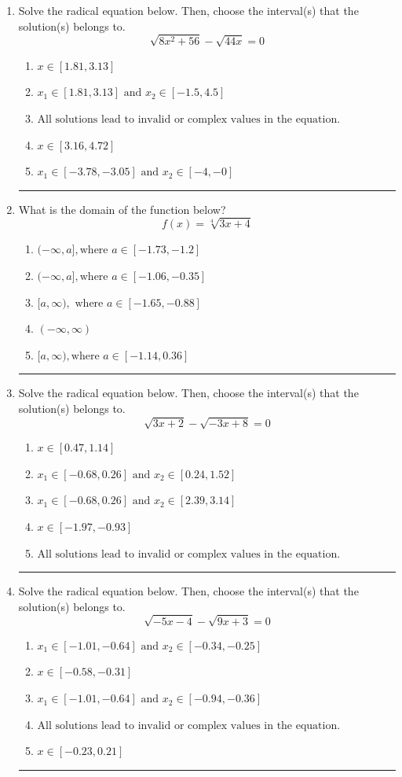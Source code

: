 \documentclass[14pt]{extbook}
\newcommand{\litem}[1]{\item#1\hspace*{-1cm}\rule{\textwidth}{0.4pt}}
\begin{document}
\begin{enumerate}
\litem{
Solve the radical equation below. Then, choose the interval(s) that the solution(s) belongs to.\[ \sqrt{8 x^2 + 56} - \sqrt{44 x} = 0 \]\begin{enumerate}[label=\Alph*.]
\item \( x \in [1.81,3.13] \)
\item \( x_1 \in [1.81, 3.13] \text{ and } x_2 \in [-1.5,4.5] \)
\item \( \text{All solutions lead to invalid or complex values in the equation.} \)
\item \( x \in [3.16,4.72] \)
\item \( x_1 \in [-3.78, -3.05] \text{ and } x_2 \in [-4,-0] \)

\end{enumerate} }
\litem{
What is the domain of the function below?\[ f(x) = \sqrt[4]{3 x + 4} \]\begin{enumerate}[label=\Alph*.]
\item \( (-\infty, a], \text{where } a \in [-1.73, -1.2] \)
\item \( (-\infty, a], \text{where } a \in [-1.06, -0.35] \)
\item \( [a, \infty), \text{ where } a \in [-1.65, -0.88] \)
\item \( (-\infty, \infty) \)
\item \( [a, \infty), \text{where } a \in [-1.14, 0.36] \)

\end{enumerate} }
\litem{
Solve the radical equation below. Then, choose the interval(s) that the solution(s) belongs to.\[ \sqrt{3 x + 2} - \sqrt{-3 x + 8} = 0 \]\begin{enumerate}[label=\Alph*.]
\item \( x \in [0.47,1.14] \)
\item \( x_1 \in [-0.68, 0.26] \text{ and } x_2 \in [0.24,1.52] \)
\item \( x_1 \in [-0.68, 0.26] \text{ and } x_2 \in [2.39,3.14] \)
\item \( x \in [-1.97,-0.93] \)
\item \( \text{All solutions lead to invalid or complex values in the equation.} \)

\end{enumerate} }
\litem{
Solve the radical equation below. Then, choose the interval(s) that the solution(s) belongs to.\[ \sqrt{-5 x - 4} - \sqrt{9 x + 3} = 0 \]\begin{enumerate}[label=\Alph*.]
\item \( x_1 \in [-1.01, -0.64] \text{ and } x_2 \in [-0.34,-0.25] \)
\item \( x \in [-0.58,-0.31] \)
\item \( x_1 \in [-1.01, -0.64] \text{ and } x_2 \in [-0.94,-0.36] \)
\item \( \text{All solutions lead to invalid or complex values in the equation.} \)
\item \( x \in [-0.23,0.21] \)


\end{enumerate}}
\end{enumerate}
\end{document}
